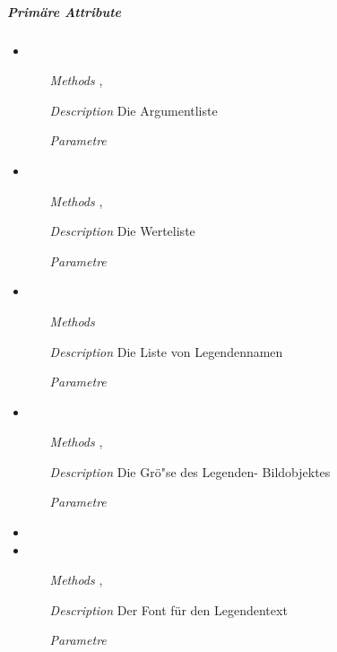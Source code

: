 \subparagraph{Prim\"are Attribute}
\begin{itemize}
  
\item {}
\begin{enumerate}
\item[\textit{Methods}] ,
\item[\textit{Description}] Die Argumentliste
\item[\textit{Parametre}] 
\end{enumerate}

\item {}
\begin{enumerate}
\item[\textit{Methods}] ,
\item[\textit{Description}] Die Werteliste
\item[\textit{Parametre}] 
\end{enumerate}

\item {}
\begin{enumerate}
\item[\textit{Methods}] 
\item[\textit{Description}] Die Liste von Legendennamen
\item[\textit{Parametre}] 
\end{enumerate}

\item {}
\begin{enumerate}
\item[\textit{Methods}] ,
\item[\textit{Description}] Die Gr\"o"se des Legenden- Bildobjektes
\item[\textit{Parametre}] 
\end{enumerate}

\item {}
\item {}
\begin{enumerate}
\item[\textit{Methods}] , 
\item[\textit{Description}] Der Font f\"ur den Legendentext
\item[\textit{Parametre}] 
\end{enumerate}


\end{itemize}
